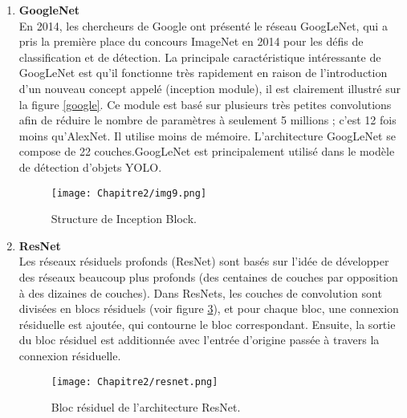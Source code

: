 \begin{enumerate}
La figure \ref{vgg} montre la configuration de VGG-16. La principale différence entre VGG-16 et ses prédécesseurs est l'utilisation d'un empilement de couches de convolution avec de petits champs réceptifs  dans les premières couches au lieu de quelques couches avec grands champs réceptifs. Cela conduit à moins de paramètres et plus de non-linéarités entre les deux, rendant ainsi la fonction de décision plus discriminante et le modèle plus facile à entraîner.
\begin{figure}[H]
\centering
\texttt{[image: Chapitre2/vgg.png]}
\caption{Architecture du réseau convolutif VGG-16. }
\label{vgg}
\end{figure} 

\item \textbf{GoogleNet}\cite{google}\\
En 2014, les chercheurs de Google ont présenté le réseau GoogLeNet, qui a pris la première place du concours ImageNet en 2014 pour les défis de classification et de détection. La principale caractéristique intéressante de GoogLeNet est qu'il fonctionne très rapidement en raison de l'introduction d'un nouveau concept appelé (inception module), il est clairement illustré sur la figure \ref{google}. Ce module est basé sur plusieurs très petites convolutions afin de réduire  le nombre de paramètres à seulement 5 millions ; c'est 12 fois moins qu'AlexNet. Il utilise moins de mémoire. L'architecture GoogLeNet se compose de 22 couches.GoogLeNet est principalement utilisé dans le modèle de détection d'objets YOLO.
\begin{figure}[H]
 \centering
\texttt{[image: Chapitre2/img9.png]}
\caption{Structure de Inception Block.}
 \label{img9}
 \end{figure}

\item \textbf{ResNet}\cite{resnet}\\
Les réseaux résiduels profonds (ResNet) sont basés sur l'idée de développer des réseaux beaucoup plus profonds (des centaines de couches par opposition à des dizaines de couches). Dans ResNets, les couches de convolution sont divisées en blocs résiduels (voir figure \ref{resnet}), et pour chaque bloc, une connexion résiduelle est ajoutée, qui contourne le bloc correspondant. Ensuite, la sortie du bloc résiduel est additionnée avec l'entrée d'origine passée à travers la connexion résiduelle. 
\begin{figure}[H]
\centering
\texttt{[image: Chapitre2/resnet.png]}
\caption{ Bloc résiduel de l'architecture ResNet. \cite{resnet}}
\label{resnet}
\end{figure} 


\end{enumerate}
